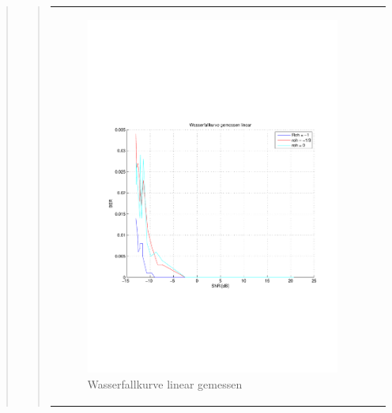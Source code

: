 \begin{quote}
\begin{quote}
\begin{center}
\begin{tabular}{ll}
\begin{minipage}{0.6\textwidth}
                        \begin{figure}[H]
                            \label{fig:}
                            \includegraphics[scale=0.45, trim = 1.5cm 7cm 1cm
                            8.5cm, clip]{./Bilder/aufgabe2/Wasserfallkurve_gemessen_linear}
                            \caption{Wasserfallkurve linear gemessen}
                        \end{figure}
    
                    \end{minipage}
                    \begin{minipage}{0.6\textwidth}
    

\end{minipage}
\end{tabular}
\end{center}
\end{quote}
\end{quote}
